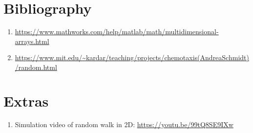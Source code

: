 \documentclass{article}
\begin{document}
\section{Bibliography}

\begin{enumerate}
    \item \url{https://www.mathworks.com/help/matlab/math/multidimensional-arrays.html}
    \item \url{https://www.mit.edu/~kardar/teaching/projects/chemotaxis(AndreaSchmidt)/random.html}
\end{enumerate}

\section{Extras}
\begin{enumerate}
    \item Simulation video of random walk in 2D: \url{https://youtu.be/99tQ8SE9IXw}
\end{enumerate}
\end{document}

